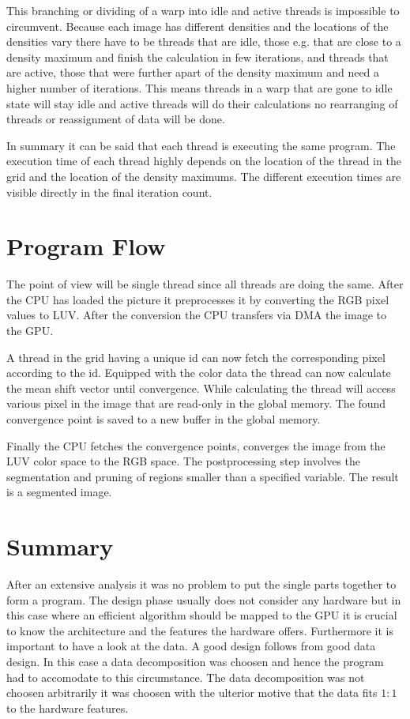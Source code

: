 This branching or dividing of a warp into idle and active threads is impossible
to circumvent. Because each image has different densities and the locations
of the densities vary there have to be threads that are idle, those e.g. that
are close to a density maximum and finish the calculation in few iterations,
and threads that are active, those that were further apart of the density maximum
and need a higher number of iterations. This means threads in a warp that
are gone to idle state will stay idle and active threads will do their 
calculations no rearranging of threads or reassignment of data will be done. 

In summary it can be said that each thread is executing the same program. The 
execution time of each thread highly depends on the location of the thread in
the grid and the location of the density maximums. The different execution times
are visible directly in the final iteration count. 

\section{Program Flow} %
\label{sec:program_flow}

The point of view will be single thread since all threads are doing the same. 
After the \gls{CPU} has loaded the picture it preprocesses it by converting
the \gls{RGB} pixel values to \gls{LUV}. After the conversion the \gls{CPU}
transfers via \gls{DMA} the image to the \gls{GPU}.

A thread in the grid having a unique id can now fetch the corresponding pixel
according to the id. Equipped with the color data the thread can now calculate
the mean shift vector until convergence. While calculating the thread will 
access various pixel in the image that are read-only in the global memory. The 
found convergence point is saved to a new buffer in the global memory.

Finally the \gls{CPU} fetches the convergence points, converges the image from 
the \gls{LUV} color space to the \gls{RGB} space. The postprocessing step
involves the segmentation and pruning of regions smaller than a specified 
variable. The result is a segmented image. 


\section{Summary} %
\label{sec:design_summary}
After an extensive analysis it was no problem to put the single parts together
to form a program. The design phase usually does not consider any hardware but
in this case where an efficient algorithm should be mapped to the \gls{GPU} it
is crucial to know the architecture and the features the hardware offers. 
Furthermore it is important to have a look at the data. A good design follows
from good data design. In this case a data decomposition was choosen and hence the 
program had to accomodate to this circumstance. The data decomposition was not 
choosen arbitrarily it was choosen with the ulterior motive that the data fits
$1:1$ to the hardware features. 

